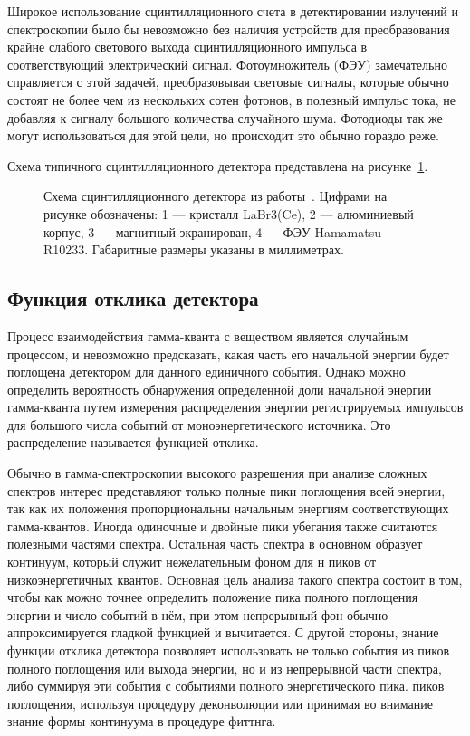 Широкое использование сцинтилляционного счета в детектировании излучений и спектроскопии было бы невозможно без наличия устройств для преобразования крайне слабого светового выхода сцинтилляционного импульса в соответствующий электрический сигнал. Фотоумножитель (ФЭУ) замечательно справляется с этой задачей, преобразовывая световые сигналы, которые обычно состоят не более чем из нескольких сотен фотонов, в полезный импульс тока, не добавляя к сигналу большого количества случайного шума. Фотодиоды так же могут использоваться для этой цели, но происходит это обычно гораздо реже.~\cite{Knoll2010}

Схема типичного сцинтилляционного детектора представлена на рисунке~\ref{fig:scintillatorSchemeExample}.

\begin{figure}[ht]
  \caption{ Схема сцинтилляционного детектора из работы~\cite{Grozdanov2021}. Цифрами на рисунке обозначены: 1 --- кристалл LaBr3(Ce), 2 --- алюминиевый корпус, 3 --- магнитный экранирован, 4 --- ФЭУ Hamamatsu R10233. Габаритные размеры указаны в миллиметрах.}
  \label{fig:scintillatorSchemeExample}
\end{figure}



\subsection{Функция отклика детектора}

Процесс взаимодействия гамма-кванта с веществом является случайным процессом, и невозможно предсказать, какая часть его начальной энергии будет поглощена детектором для данного единичного события. Однако можно определить вероятность обнаружения определенной доли начальной энергии гамма-кванта путем измерения распределения энергии регистрируемых импульсов для большого числа событий от моноэнергетического источника. Это распределение называется функцией отклика.~\cite{Grozdanov2021} 

Обычно в гамма-спектроскопии высокого разрешения при анализе сложных спектров интерес представляют только полные пики поглощения всей энергии, так как их положения пропорциональны начальным энергиям соответствующих гамма-квантов. Иногда одиночные и двойные пики убегания также считаются полезными частями спектра. Остальная часть спектра в основном образует континуум, который служит нежелательным фоном для н пиков от низкоэнергетичных квантов. Основная цель анализа такого спектра состоит в том, чтобы как можно точнее определить положение пика полного поглощения энергии и число событий в нём, при этом непрерывный фон обычно аппроксимируется гладкой функцией и вычитается. С другой стороны, знание функции отклика детектора позволяет использовать не только события из пиков полного поглощения или выхода энергии, но и из непрерывной части спектра, либо суммируя эти события с событиями полного энергетического пика. пиков поглощения, используя процедуру деконволюции или принимая во внимание знание формы континуума в процедуре фиттнга.~\cite{Grozdanov2021}

